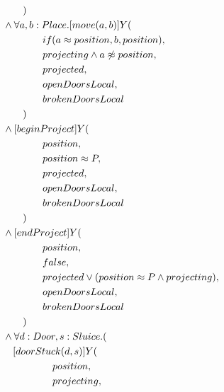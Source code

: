 \begin{description}
\begin{align*}
& \tab\tab\tab\tab\tab\tab\tab\tab ) \\
& \tab\tab\tab\tab\tab\tab  \wedge \forall a, b: Place . [move(a, b)]Y( \\
& \tab\tab\tab\tab\tab\tab\tab\tab\tab\tab if(a \approx position, b, position), \\
& \tab\tab\tab\tab\tab\tab\tab\tab\tab\tab projecting \wedge a \not\approx position, \\
& \tab\tab\tab\tab\tab\tab\tab\tab\tab\tab projected, \\
& \tab\tab\tab\tab\tab\tab\tab\tab\tab\tab openDoorsLocal, \\
& \tab\tab\tab\tab\tab\tab\tab\tab\tab\tab brokenDoorsLocal \\
& \tab\tab\tab\tab\tab\tab\tab\tab ) \\
& \tab\tab\tab\tab\tab\tab  \wedge [beginProject]Y( \\
& \tab\tab\tab\tab\tab\tab\tab\tab\tab\tab position, \\
& \tab\tab\tab\tab\tab\tab\tab\tab\tab\tab position \approx P, \\
& \tab\tab\tab\tab\tab\tab\tab\tab\tab\tab projected, \\
& \tab\tab\tab\tab\tab\tab\tab\tab\tab\tab openDoorsLocal, \\
& \tab\tab\tab\tab\tab\tab\tab\tab\tab\tab brokenDoorsLocal \\
& \tab\tab\tab\tab\tab\tab\tab\tab ) \\
& \tab\tab\tab\tab\tab\tab  \wedge [endProject]Y( \\
& \tab\tab\tab\tab\tab\tab\tab\tab\tab\tab position, \\
& \tab\tab\tab\tab\tab\tab\tab\tab\tab\tab false, \\
& \tab\tab\tab\tab\tab\tab\tab\tab\tab\tab projected \vee (position \approx P \wedge projecting), \\
& \tab\tab\tab\tab\tab\tab\tab\tab\tab\tab openDoorsLocal, \\
& \tab\tab\tab\tab\tab\tab\tab\tab\tab\tab brokenDoorsLocal \\
& \tab\tab\tab\tab\tab\tab\tab\tab ) \\
& \tab\tab\tab\tab\tab\tab  \wedge \forall d: Door, s: Sluice . ( \\ 
& \tab\tab\tab\tab\tab\tab\tab [doorStuck(d, s)]Y( \\
& \tab\tab\tab\tab\tab\tab\tab\tab\tab\tab\tab position, \\
& \tab\tab\tab\tab\tab\tab\tab\tab\tab\tab\tab projecting, \\

\end{align*}
\end{description}
